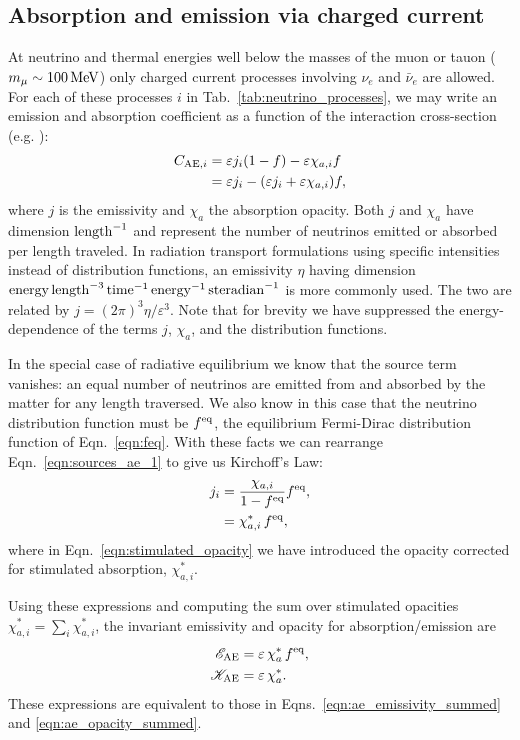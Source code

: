 \documentclass[aps,floatfix,prd,superscriptaddress,twocolumn]{revtex4-1}
\begin{document}
\subsection{Absorption and emission via charged current}
\label{ssec:sources_ae}
At neutrino and thermal energies well below the masses of the muon or tauon
($m_{\mu}\sim100\,{\rm MeV}$)
only charged current processes involving $\nu_e$ and $\bar{\nu}_e$ are allowed.
For each of these processes $i$ in Tab.~\ref{tab:neutrino_processes},
we may write an emission and absorption
coefficient as a function of the interaction cross-section
(e.g. \cite[Eqn.~A5]{brue1985-core_collapse}):
\begin{align}
  \label{eqn:sources_ae_1}
  C_{{\rm AE},i}
  &= \varepsilon j_i (1-f) - \varepsilon \chi_{a,i} f \\
  \label{eqn:sources_ae_2}
  &= \varepsilon j_i - (\varepsilon j_i+\varepsilon \chi_{a,i}) f,
\end{align}
where $j$ is the emissivity and $\chi_a$ the absorption opacity.
Both $j$ and $\chi_a$ have dimension ${\rm length}^{-1}$ and represent the
number of neutrinos emitted or absorbed per length traveled.
In radiation transport formulations using specific intensities instead of
distribution functions, an emissivity $\eta$ having dimension
${\rm energy}\,{\rm length}^{-3}\,{\rm time}^{-1}\,{\rm energy}^{-1}\,{\rm steradian}^{-1}$
is more commonly used.
The two are related by $j=(2\pi)^3\eta/\varepsilon^3$.
Note that for brevity we have suppressed the energy-dependence of
the terms $j$, $\chi_a$, and the distribution functions.

In the special case of radiative equilibrium we know that the source
term vanishes: an equal number of neutrinos are emitted from
and absorbed by the matter for any length traversed.
We also know in this case that the neutrino distribution function must be
$f^{\rm eq}$, the equilibrium Fermi-Dirac distribution function of
Eqn.~\ref{eqn:feq}.
With these facts we can rearrange Eqn.~\ref{eqn:sources_ae_1} to give us
Kirchoff's Law:
\begin{align}
  \label{eqn:kirchoffs_law}
  j_i &= \frac{\chi_{a,i}}{1-f^{\rm eq}}f^{\rm eq}, \\
  \label{eqn:stimulated_opacity}
  &= \chi^*_{a,i}\,f^{\rm eq},
\end{align}
where in Eqn.~\ref{eqn:stimulated_opacity} we have introduced the opacity
corrected for stimulated absorption, $\chi^*_{a,i}$.

Using these expressions and computing the sum over stimulated opacities
$\chi^*_{a,i}=\sum_i \chi^*_{a,i}$,
the invariant emissivity and opacity for absorption/emission are
\begin{align}
  \label{eqn:ae_emissivity_summed_2}
  \mathscr{E}_{{\rm AE}} &= \varepsilon \, \chi^*_a \, f^{\rm eq}, \\
  \label{eqn:ae_opacity_summed_2}
  \mathscr{K}_{{\rm AE}} &= \varepsilon \, \chi^*_a.
\end{align}
These expressions are equivalent to those in
Eqns.~\ref{eqn:ae_emissivity_summed} and \ref{eqn:ae_opacity_summed}.
\end{document}
